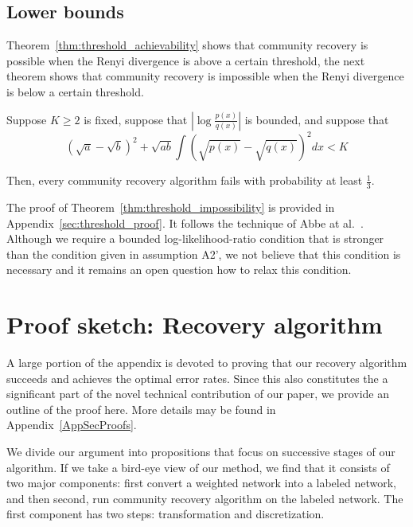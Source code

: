 \subsection{Lower bounds}

Theorem~\ref{thm:threshold_achievability} shows that community recovery is possible when the Renyi divergence is above a certain threshold, the next theorem shows that community recovery is impossible when the Renyi divergence is below a certain threshold. 


\begin{theorem}
\label{thm:threshold_impossibility}
Suppose $K \geq 2$ is fixed, suppose that $\left| \log \frac{p(x)}{q(x)} \right|$ is bounded, and suppose that
\[
 (\sqrt{a} - \sqrt{b})^2 + \sqrt{ab} \int (\sqrt{p(x)} - \sqrt{q(x)})^2 dx < K
\]

Then, every community recovery algorithm fails with probability at least $\frac{1}{3}$. 
\end{theorem}
The proof of Theorem~\ref{thm:threshold_impossibility} is provided in Appendix~\ref{sec:threshold_proof}. It follows the technique of Abbe at al.~\cite{abbe2014exact}. Although we require a bounded log-likelihood-ratio condition that is stronger than the condition given in assumption A2', we not believe that this condition is necessary and it remains an open question how to relax this condition. 


\section{Proof sketch: Recovery algorithm}
\label{SecProofs}

A large portion of the appendix is devoted to proving that our recovery algorithm succeeds and achieves the optimal error rates. Since this also constitutes the a significant part of the novel technical contribution of our paper, we provide an outline of the proof here. More details may be found in Appendix~\ref{AppSecProofs}.

We divide our argument into propositions that focus on successive stages of our algorithm. If we take a bird-eye view of our method, we find that it consists of two major components: first convert a weighted network into a labeled network, and then second, run community recovery algorithm on the labeled network. The first component has two steps: transformation and discretization. 

